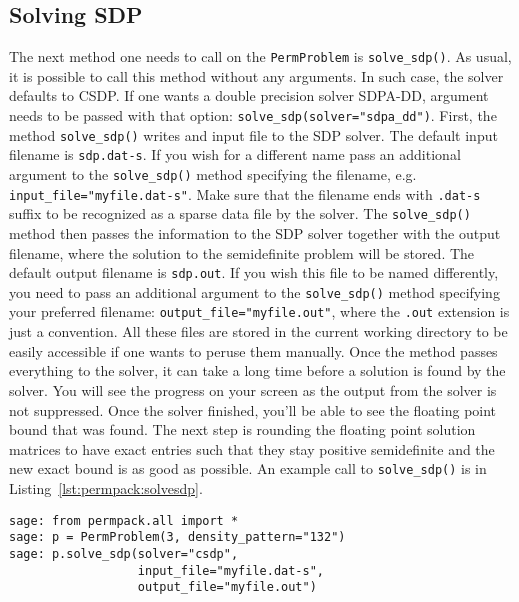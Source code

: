 \subsection{Solving SDP}
The next method one needs to call on the \texttt{PermProblem} is \texttt{solve\_sdp()}. As usual, it is possible to call this method without any arguments. In such case, the solver defaults to CSDP. If one wants a double precision solver SDPA-DD, argument needs to be passed with that option: \texttt{solve\_sdp(solver="sdpa\_dd")}. First, the method \texttt{solve\_sdp()} writes and input file to the SDP solver. The default input filename is \texttt{sdp.dat-s}. If you wish for a different name pass an additional argument to the \texttt{solve\_sdp()} method specifying the filename, e.g. \texttt{input\_file="myfile.dat-s"}. Make sure that the filename ends with \texttt{.dat-s} suffix to be recognized as a sparse data file by the solver. The \texttt{solve\_sdp()} method then passes the information to the SDP solver together with the output filename, where the solution to the semidefinite problem will be stored. The default output filename is \texttt{sdp.out}. If you wish this file to be named differently, you need to pass an additional argument to the \texttt{solve\_sdp()} method specifying your preferred filename: \texttt{output\_file="myfile.out"}, where the \texttt{.out} extension is just a convention. All these files are stored in the current working directory to be easily accessible if one wants to peruse them manually. Once the method passes everything to the solver, it can take a long time before a solution is found by the solver. You will see the progress on your screen as the output from the solver is not suppressed. Once the solver finished, you'll be able to see the floating point bound that was found. The next step is rounding the floating point solution matrices to have exact entries such that they stay positive semidefinite and the new exact bound is as good as possible. An example call to \texttt{solve\_sdp()} is in Listing~\ref{lst:permpack:solvesdp}.

 {}
\begin{lstlisting}
sage: from permpack.all import *
sage: p = PermProblem(3, density_pattern="132")
sage: p.solve_sdp(solver="csdp",
                  input_file="myfile.dat-s",
                  output_file="myfile.out")
\end{lstlisting}

